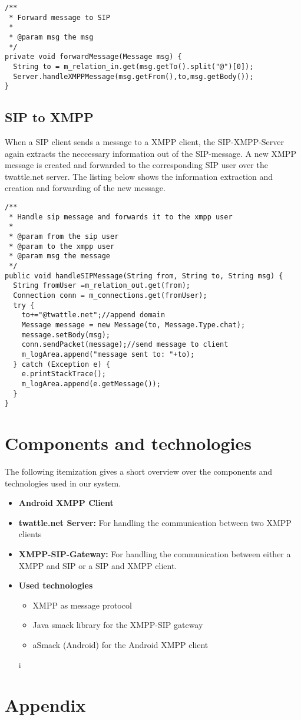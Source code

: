 \documentclass{article}
\begin{document}
\begin{lstlisting}[caption={Forwarding of XMPP Messages to SIP}]
/**
 * Forward message to SIP
 *
 * @param msg the msg
 */
private void forwardMessage(Message msg) {
  String to = m_relation_in.get(msg.getTo().split("@")[0]);
  Server.handleXMPPMessage(msg.getFrom(),to,msg.getBody());
}
\end{lstlisting}
\subsection{SIP to XMPP}

When a SIP client sends a message to a XMPP client, the SIP-XMPP-Server again extracts the neccessary information out of the SIP-message. A new XMPP message is created and forwarded to the corresponding SIP user over the twattle.net server. The listing below shows the information extraction and creation and forwarding of the new message.

\begin{lstlisting}[caption={Forwarding of XMPP Messages to SIP}]
/**
 * Handle sip message and forwards it to the xmpp user
 *
 * @param from the sip user
 * @param to the xmpp user
 * @param msg the message
 */
public void handleSIPMessage(String from, String to, String msg) {
  String fromUser =m_relation_out.get(from);
  Connection conn = m_connections.get(fromUser);
  try {
    to+="@twattle.net";//append domain
    Message message = new Message(to, Message.Type.chat);
    message.setBody(msg);
    conn.sendPacket(message);//send message to client
    m_logArea.append("message sent to: "+to);
  } catch (Exception e) {
    e.printStackTrace();
    m_logArea.append(e.getMessage());
  }
}
    \end{lstlisting}
    
\newpage
\section{Components and technologies}

The following itemization gives a short overview over the components and technologies used in our system.\\

\begin{itemize}
    \item \textbf{Android XMPP Client}
    \item \textbf{twattle.net Server:} For handling the communication between two XMPP clients
    \item \textbf{XMPP-SIP-Gateway:} For handling the communication between either a XMPP and SIP or a SIP and XMPP client.
    \item \textbf{Used technologies}
        \begin{itemize}
            \item XMPP as message protocol
            \item Java smack library for the XMPP-SIP gateway
            \item aSmack (Android) for the Android XMPP client
        \end{itemize}i
\end{itemize}

\newpage
\section{Appendix}
\end{document}
